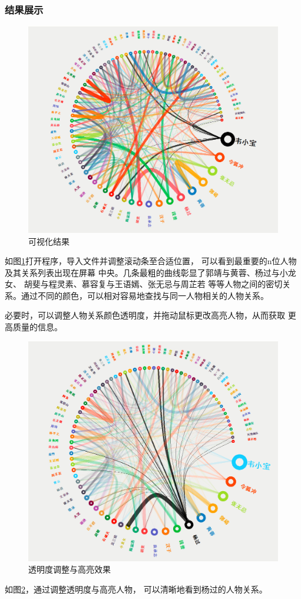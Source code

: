 \documentclass[a4paper,UTF8]{article}
\numberwithin{equation}{section}
\begin{document}
\subsubsection{结果展示}
\begin{figure}[htbp]
    \centering
    \includegraphics[width = 15cm]{task6-result.png}
    \caption{可视化结果}
    \label{task6-result}
\end{figure}
如图\ref{task6-result}打开程序，导入文件并调整滚动条至合适位置，
可以看到最重要的n位人物及其关系列表出现在屏幕
中央。几条最粗的曲线彰显了郭靖与黄蓉、杨过与小龙女、
胡斐与程灵素、慕容复与王语嫣、张无忌与周芷若
等等人物之间的密切关系。通过不同的颜色，可以相对容易地查找与同一人物相关的人物关系。
\par 必要时，可以调整人物关系颜色透明度，并拖动鼠标更改高亮人物，从而获取
更高质量的信息。
\begin{figure}[htbp]
    \centering
    \includegraphics[width = 15cm]{task6-result2.png}
    \caption{透明度调整与高亮效果}
    \label{task6-result2}
\end{figure}
如图\ref{task6-result2}，通过调整透明度与高亮人物，
可以清晰地看到杨过的人物关系。
\end{document}
